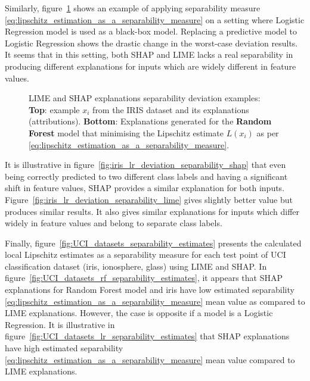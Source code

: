 \documentclass[english]{tktltiki2}
\theoremstyle{definition}
\theoremstyle{remark}
\begin{document}
Similarly, figure~\ref{fig:iris_lr_deviation_separability} shows an example of applying separability measure \eqref{eq:lipschitz_estimation_as_a_separability_measure} on a setting where Logistic Regression model is used as a black-box model. Replacing a predictive model to Logistic Regression shows the drastic change in the worst-case deviation results. It seems that in this setting, both SHAP and LIME lacks a real separability in producing different explanations for inputs which are widely different in feature values.
\begin{figure}[H]
	\hspace*{\fill}%
	\caption{LIME and SHAP explanations separability deviation examples: \textbf{Top}: example $x_i$ from the IRIS dataset and its explanations (attributions). \textbf{Bottom}: Explanations generated for the \textbf{Random Forest} model that minimising the Lipschitz estimate $L(x_i)$ as per \eqref{eq:lipschitz_estimation_as_a_separability_measure}.}%
	\label{fig:iris_lr_deviation_separability}%
\end{figure}

It is illustrative in figure~\ref{fig:iris_lr_deviation_separability_shap} that even being correctly predicted to two different class labels and having a significant shift in feature values, SHAP provides a similar explanation for both inputs. Figure~\ref{fig:iris_lr_deviation_separability_lime} gives slightly better value but produces similar results. It also gives similar explanations for inputs which differ widely in feature values and belong to separate class labels.

Finally, figure~\ref{fig:UCI_datasets_separability_estimates} presents the calculated local Lipschitz estimates as a separability measure for each test point of UCI classification dataset (iris, ionosphere, glass) using LIME and SHAP. In figure~\ref{fig:UCI_datasets_rf_separability_estimates}, it appears that SHAP explanations for Random Forest model and iris have low estimated separability \eqref{eq:lipschitz_estimation_as_a_separability_measure} mean value as compared to LIME explanations. However, the case is opposite if a model is a Logistic Regression. It is illustrative in figure~\ref{fig:UCI_datasets_lr_separability_estimates} that SHAP explanations have high estimated separability \eqref{eq:lipschitz_estimation_as_a_separability_measure} mean value compared to LIME explanations.
\end{document}
